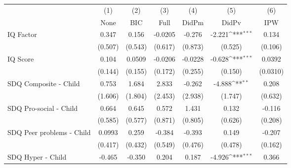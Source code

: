 {
\def\sym#1{\ifmmode^{#1}\else\(^{#1}\)\fi}
\begin{tabular}{l*{6}{c}}
\toprule
            &\multicolumn{1}{c}{(1)}&\multicolumn{1}{c}{(2)}&\multicolumn{1}{c}{(3)}&\multicolumn{1}{c}{(4)}&\multicolumn{1}{c}{(5)}&\multicolumn{1}{c}{(6)}\\
            &\multicolumn{1}{c}{None}&\multicolumn{1}{c}{BIC}&\multicolumn{1}{c}{Full}&\multicolumn{1}{c}{DidPm}&\multicolumn{1}{c}{DidPv}&\multicolumn{1}{c}{IPW}\\
\midrule
IQ Factor   &       0.347         &       0.156         &     -0.0205         &      -0.276         &      -2.221\sym{***}&       0.134         \\
            &     (0.507)         &     (0.543)         &     (0.617)         &     (0.873)         &     (0.525)         &     (0.106)         \\
\addlinespace
IQ Score    &       0.104         &      0.0509         &     -0.0206         &     -0.0228         &      -0.628\sym{***}&      0.0392         \\
            &     (0.144)         &     (0.155)         &     (0.172)         &     (0.255)         &     (0.150)         &    (0.0310)         \\
\addlinespace
SDQ Composite - Child&       0.753         &       1.684         &       2.833         &      -0.262         &      -4.888\sym{**} &       0.208         \\
            &     (1.606)         &     (1.804)         &     (2.453)         &     (2.938)         &     (1.747)         &     (0.632)         \\
\addlinespace
SDQ Pro-social - Child&       0.664         &       0.645         &       0.572         &       1.431         &       0.132         &      -0.116         \\
            &     (0.585)         &     (0.577)         &     (0.871)         &     (0.805)         &     (0.626)         &     (0.208)         \\
\addlinespace
SDQ Peer problems - Child&      0.0993         &       0.259         &      -0.384         &      -0.393         &       0.149         &      -0.207         \\
            &     (0.417)         &     (0.432)         &     (0.549)         &     (0.476)         &     (0.478)         &     (0.162)         \\
\addlinespace
SDQ Hyper - Child&      -0.465         &      -0.350         &       0.204         &       0.187         &      -4.926\sym{***}&       0.366         \\

\end{tabular}}
